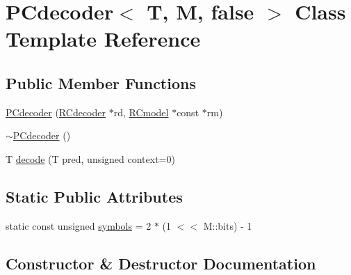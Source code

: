 \hypertarget{class_p_cdecoder_3_01_t_00_01_m_00_01false_01_4}{}\section{P\+Cdecoder$<$ T, M, false $>$ Class Template Reference}
\label{class_p_cdecoder_3_01_t_00_01_m_00_01false_01_4}
\subsection*{Public Member Functions}
\begin{DoxyCompactItemize}
\item 
\hyperlink{class_p_cdecoder_3_01_t_00_01_m_00_01false_01_4_aac82afd8e70e2db12c9c849c19406825}{P\+Cdecoder} (\hyperlink{class_r_cdecoder}{R\+Cdecoder} $\ast$rd, \hyperlink{class_r_cmodel}{R\+Cmodel} $\ast$const $\ast$rm)
\item 
\hyperlink{class_p_cdecoder_3_01_t_00_01_m_00_01false_01_4_a7f6d9d115a79bc376918fe07e3f4e84a}{$\sim$\+P\+Cdecoder} ()
\item 
T \hyperlink{class_p_cdecoder_3_01_t_00_01_m_00_01false_01_4_ada354b680cf7e5d1e6022097fa0bafe3}{decode} (T pred, unsigned context=0)
\end{DoxyCompactItemize}
\subsection*{Static Public Attributes}
\begin{DoxyCompactItemize}
\item 
static const unsigned \hyperlink{class_p_cdecoder_3_01_t_00_01_m_00_01false_01_4_a95d1ba8f67b524c03121f097dcc03860}{symbols} = 2 $\ast$ (1 $<$$<$ M\+::bits) -\/ 1
\end{DoxyCompactItemize}


\subsection{Constructor \& Destructor Documentation}
\hypertarget{class_p_cdecoder_3_01_t_00_01_m_00_01false_01_4_aac82afd8e70e2db12c9c849c19406825}{}

